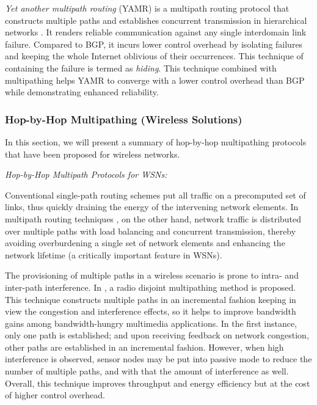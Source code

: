 \documentclass[10pt]{IEEEtran}
\begin{document}
\textit{Yet another multipath routing} (YAMR) is a multipath routing protocol that constructs multiple paths and establishes concurrent transmission in hierarchical networks \cite{ganichev2010yamr}. It renders reliable communication against any single interdomain link failure. Compared to BGP, it incurs lower control overhead by isolating failures and keeping the whole Internet oblivious of their occurrences. This technique of containing the failure is termed as \textit{hiding}. This technique combined with multipathing helps YAMR to converge with a lower control overhead than BGP while demonstrating enhanced reliability.

\vspace{2mm}
\subsubsection{Hop-by-Hop Multipathing (Wireless Solutions)}

In this section, we will present a summary of hop-by-hop multipathing protocols that have been proposed for wireless networks.

\vspace{2mm}
\textit{Hop-by-Hop Multipath Protocols for WSNs:}
\vspace{1mm}


Conventional single-path routing schemes put all traffic on a precomputed set of links, thus quickly draining the energy of the intervening network elements. In multipath routing techniques \cite{ming2007energy}, on the other hand, network traffic is distributed over multiple paths with load balancing and concurrent transmission, thereby avoiding overburdening a single set of network elements and enhancing the network lifetime (a critically important feature in WSNs).

The provisioning of multiple paths in a wireless scenario is prone to intra- and inter-path interference. In \cite{maimour2008maximally}, a radio disjoint multipathing method is proposed. This technique constructs multiple paths in an incremental fashion keeping in view the congestion and interference effects, so it helps to improve bandwidth gains among bandwidth-hungry multimedia applications. In the first instance, only one path is established; and upon receiving feedback on network congestion, other paths are established in an incremental fashion. However, when high interference is observed, sensor nodes may be put into passive mode to reduce the number of multiple paths, and with that the amount of interference as well. Overall, this technique improves throughput and energy efficiency but at the cost of higher control overhead.
\end{document}
